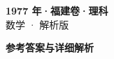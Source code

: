 \documentclass[zihao=-4, a4paper]{ctexart}
\begin{document}
\begin{center}
  {\Large\bfseries 1977 年·福建卷·理科}\\[4pt]
  {\large 数学 · 解析版}
\end{center}
\medskip
{}

\clearpage
{}
\begin{center}{\Large\bfseries 参考答案与详细解析}\end{center}
\medskip

\end{document}
